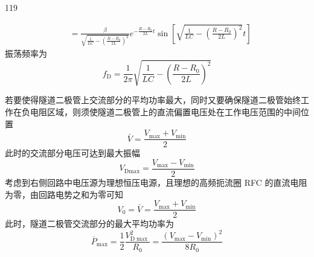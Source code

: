 \begin{solution}{119}
\begin{subsolution}
\begin{align}
            & = \frac{\beta}{\sqrt{\frac{1}{LC} - \left(\frac{R - R_{0}}{2L}\right)^{2}}} e^{-\frac{R - R_{0}}{2L} t} \sin \left[ \sqrt{\frac{1}{LC} - \left(\frac{R - R_{0}}{2L}\right)^{2}} t \right]
            \label{eq:15.s119}
        \end{align}
        振荡频率为
        \begin{equation}
            f_{\mathrm{D}} = \frac{1}{2\pi} \sqrt{\frac{1}{LC} - \left(\frac{R - R_{0}}{2L}\right)^{2}}
            \label{eq:16.s119}
        \end{equation}
    \end{subsolution}
    \begin{subsolution}
        若要使得隧道二极管上交流部分的平均功率最大，同时又要确保隧道二极管始终工作在负电阻区域，则须使隧道二极管上的直流偏置电压处在工作电压范围的中间位置
        \begin{equation}
            \bar{V} = \frac{V_{\max} + V_{\min}}{2}
            \label{eq:17.s119}
        \end{equation}
        此时的交流部分电压可达到最大振幅
        \begin{equation}
            V_{\mathrm{Dmax}} = \frac{V_{\mathrm{max}} - V_{\mathrm{min}}}{2}
            \label{eq:18.s119}
        \end{equation}
        考虑到右侧回路中电压源为理想恒压电源，且理想的高频扼流圈 RFC 的直流电阻为零，由回路电势之和为零可知
        \begin{equation}
            V_{0} = \bar{V} = \frac{V_{\max} + V_{\min}}{2}
            \label{eq:19.s119}
        \end{equation}
        此时，隧道二极管交流部分的最大平均功率为
        \begin{equation}
            \overline{P}_{\max} = \frac{1}{2} \frac{V_{\mathrm{D}\max}^{2}}{R_{0}} = \frac{(V_{\max} - V_{\min})^{2}}{8 R_{0}}
            \label{eq:20.s119}
        \end{equation}
    \end{subsolution}
\end{solution}
